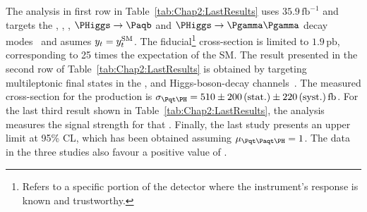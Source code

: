 \begin{table}[h]
\centering
{}
\caption{Current results for the \tHq process by the ATLAS and CMS Collaborations at $\CM = 13\,\text{TeV}$. 
The $\mu_{\tH}$ is the ratio between the cross-section measured in the experiment 
and the reference cross-section given by the SM prediction. These three analyses target the
\tH process as the combination of \tHq and \tWH.
The \schannel \tH is neglected because of its small cross-section.}
\label{tab:Chap2:LastResults}
\end{table}

The  analysis in first row in Table~\ref{tab:Chap2:LastResults} uses $35.9\,\text{fb}^{-1}$ 
and targets the \HWW, \Htautau, \HZZ, $\PHiggs\rightarrow \bbar$ and 
$\PHiggs\rightarrow \Pgamma \Pgamma$ decay modes~\cite{CMS:2018jeh}
and asumes $y_{t} = y_{t}^{\text{SM}}$.
The fiducial\footnote{Refers to a specific portion of the detector where 
the instrument's response is known and trustworthy.} cross-section is limited to
$1.9\,\text{pb}$, corresponding to 25 times the expectation of the SM.
The result presented in the second row of Table~\ref{tab:Chap2:LastResults} 
is obtained by targeting multileptonic final states in the \HWW, \Htautau and \HZZ
Higgs-boson-decay channels~\cite{CMS:2020mpn}. %
The measured cross-section for the \tH production is
$\sigma_{\tH} = 510\pm 200\,\text{(stat.)} \pm 220 \,\text{(syst.)}\,\text{fb}$.
For the last third result shown in Table~\ref{tab:Chap2:LastResults}, the 
analysis measures
the signal strength for that \tH. %
Finally, the last study presents an upper limit at 95\% CL, which has
been obtained assuming $\mu_{\ttH}=1$.
The data in the three studies also favour a positive
value of \yt. 





